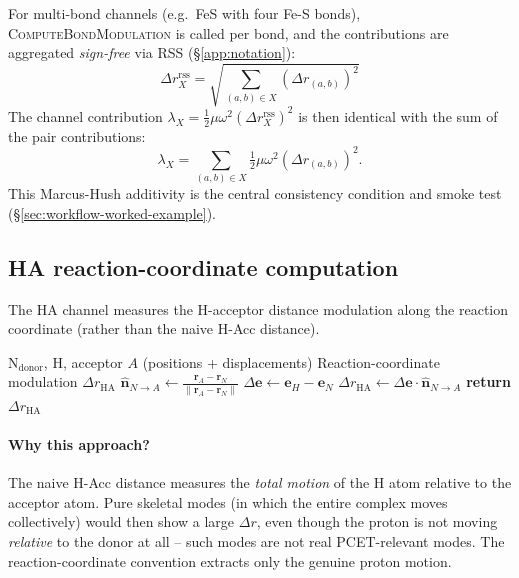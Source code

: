 \documentclass[11pt,a4paper,twoside]{article}
\theoremstyle{remark}
\begin{document}
For multi-bond channels (e.g.\ FeS with four Fe-S bonds),
\textsc{ComputeBondModulation} is called per bond, and the
contributions are aggregated \emph{sign-free} via RSS
(\S\ref{app:notation}):
\begin{equation}
  \Delta r_X^\text{rss} = \sqrt{\sum_{(a,b) \in X} (\Delta r_{(a,b)})^2}
\end{equation}
The channel contribution $\lambda_X = \tfrac{1}{2}\mu\omega^2
(\Delta r_X^\text{rss})^2$ is then identical with the sum of the
pair contributions:
\begin{equation}
  \lambda_X = \sum_{(a,b) \in X} \tfrac{1}{2}\mu\omega^2 (\Delta r_{(a,b)})^2.
  \label{eq:reorg-additivity}
\end{equation}
This Marcus-Hush additivity is the central consistency condition
and smoke test (\S\ref{sec:workflow-worked-example}).

\subsection{HA reaction-coordinate computation}
\label{app:pseudo-ha}

The HA channel measures the H-acceptor distance modulation along
the reaction coordinate (rather than the naive H-Acc distance).

\begin{algorithm}[H]
\caption{\textsc{ComputeHAReactionCoord}}
\begin{algorithmic}[1]
\Require N$_\text{donor}$, H, acceptor $A$ (positions + displacements)
\Ensure Reaction-coordinate modulation $\Delta r_\text{HA}$
\State $\hat{\mathbf{n}}_{N\to A} \gets
       \frac{\mathbf{r}_A - \mathbf{r}_N}
            {\|\mathbf{r}_A - \mathbf{r}_N\|}$
\State $\Delta\mathbf{e} \gets \mathbf{e}_H - \mathbf{e}_N$
\State $\Delta r_\text{HA} \gets \Delta\mathbf{e} \cdot
       \hat{\mathbf{n}}_{N\to A}$
\State \textbf{return} $\Delta r_\text{HA}$
\end{algorithmic}
\end{algorithm}

\paragraph{Why this approach?}
The naive H-Acc distance measures the \emph{total motion} of the
H atom relative to the acceptor atom. Pure skeletal modes (in
which the entire complex moves collectively) would then show a
large $\Delta r$, even though the proton is not moving
\emph{relative} to the donor at all -- such modes are not real
PCET-relevant modes. The reaction-coordinate convention extracts
only the genuine proton motion.
\end{document}
